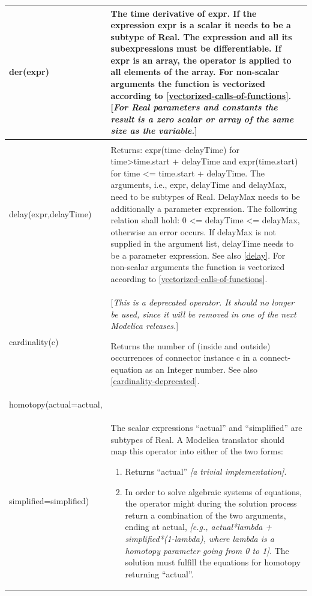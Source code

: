 \documentclass[10pt,a4paper]{report}
\renewcommand{\labelenumi}{\arabic{enumi}.}
\begin{document}
\begin{longtable}{|p{5.1cm}|p{8cm}|} 
\hline \endhead
der(expr) & The time derivative of expr. If the expression expr is a
scalar it needs to be a subtype of Real. The expression and all its
subexpressions must be differentiable. If expr is an array, the operator
is applied to all elements of the array. For non-scalar arguments the
function is vectorized according to \ref{vectorized-calls-of-functions}. {[}\emph{For Real
parameters and constants the result is a zero scalar or array of the
same size as the variable.}{]}\\ \hline
\begin{tabular}{@{}p{5.1cm}@{}}
delay(expr,delayTime,delayMax)\\
delay(expr,delayTime)
\end{tabular} & 
Returns: expr(time--delayTime) for~ time\textgreater{}time.start +
delayTime and expr(time.start) for time \textless{}= time.start +
delayTime. The arguments, i.e., expr, delayTime and delayMax, need to be
subtypes of Real. DelayMax needs to be additionally a parameter
expression. The following relation shall hold: 0 \textless{}= delayTime
\textless{}= delayMax, otherwise an error occurs. If delayMax is not
supplied in the argument list, delayTime needs to be a parameter
expression. See also \ref{delay}. For non-scalar arguments the
function is vectorized according to \ref{vectorized-calls-of-functions}.\\ \hline
cardinality(c) & {[}\emph{This is a deprecated operator. It should no longer be used,
since it will be removed in one of the next Modelica releases.}{]}

Returns the number of (inside and outside) occurrences of connector
instance c in a connect-equation as an Integer number. See also \ref{cardinality-deprecated}.\\ \hline
homotopy(actual=actual,\\
simplified=simplified) & The scalar expressions ``actual'' and ``simplified'' are subtypes of
Real. A Modelica translator should map this operator into either of the
two forms:

\begin{enumerate}
\def\labelenumi{\arabic{enumi}.}
\item
  Returns ``actual'' \emph{{[}a trivial implementation{]}}.
\item
  In order to solve algebraic systems of equations, the operator might
  during the solution process return a combination of the two arguments,
  ending at actual, \emph{{[}e.g.,
  actual*lambda + simplified*(1-lambda),
  where lambda is a homotopy parameter going from 0 to 1{]}.}
  The solution must fulfill the equations for homotopy returning
  ``actual''.
\end{enumerate}


\end{longtable}
\end{document}
